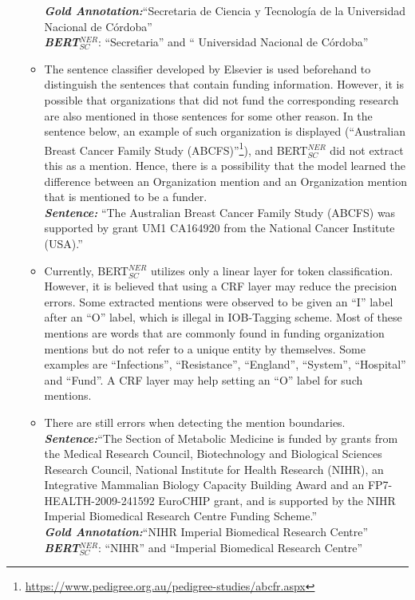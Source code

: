 \documentclass{report}
\theoremstyle{definition}
\theoremstyle{remark}
\begin{document}
\begin{itemize}
\begin{itemize}
        \textbf{\textit{Gold Annotation:}}``Secretaria de Ciencia y Tecnología de la Universidad Nacional de Córdoba''\\
        \textbf{\textit{BERT}}$_{SC}^{NER}$: ``Secretaria'' and `` Universidad Nacional de Córdoba''
        \newline
        \item The sentence classifier developed by Elsevier is used beforehand to distinguish the sentences that contain funding information. However, it is possible that organizations that did not fund the corresponding research are also mentioned in those sentences for some other reason. In the sentence below, an example of such organization is displayed (``Australian Breast Cancer Family Study (ABCFS)''\footnote{\url{https://www.pedigree.org.au/pedigree-studies/abcfr.aspx}}), and BERT$_{SC}^{NER}$ did not extract this as a mention. Hence, there is a possibility that the model learned the difference between an Organization mention and an Organization mention that is mentioned to be a funder. \\
        \newline
        \textbf{\textit{Sentence:}} ``The Australian Breast Cancer Family Study (ABCFS) was supported by grant UM1 CA164920 from the National Cancer Institute (USA).''
        \newline
        \item Currently, BERT$_{SC}^{NER}$ utilizes only a linear layer for token classification. However, it is believed that using a CRF layer may reduce the precision errors. Some extracted mentions were observed to be given an ``I'' label after an ``O'' label, which is illegal in IOB-Tagging scheme. Most of these mentions are words that are commonly found in funding organization mentions but do not refer to a unique entity by themselves. Some examples are ``Infections'', ``Resistance'', ``England'', ``System'', ``Hospital'' and ``Fund''. A CRF layer may help setting an ``O'' label for such mentions.
        \newline
        \item There are still errors when detecting the mention boundaries.\\
        \newline
         \textbf{\textit{Sentence:}}``The Section of Metabolic Medicine is funded by grants from the Medical Research Council, Biotechnology and Biological Sciences Research Council, National Institute for Health Research (NIHR), an Integrative Mammalian Biology Capacity Building Award and an FP7-HEALTH-2009-241592 EuroCHIP grant, and is supported by the NIHR Imperial Biomedical Research Centre Funding Scheme.''\\
        \textbf{\textit{Gold Annotation:}}``NIHR Imperial Biomedical Research Centre''\\
        \textbf{\textit{BERT}}$_{SC}^{NER}$: ``NIHR'' and ``Imperial Biomedical Research Centre''
    \end{itemize}
\end{itemize}
\end{document}
